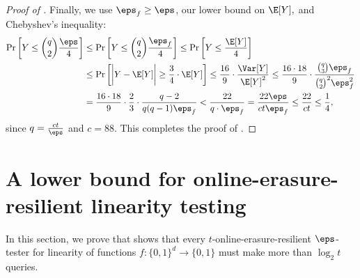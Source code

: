 \documentclass[11pt]{article}
\numberwithin{equation}{section}
\theoremstyle{definition}
\theoremstyle{plain}
\begin{document}
\begin{proof}[Proof of ]
Finally, we use $\eps_f \geq \eps$, our lower bound on $\E[Y],$ and Chebyshev's inequality:
\begin{align*}  %
%
\Pr \bigg[Y \leq \binom{q}{2} \frac{\eps}{4} \bigg] &\leq \Pr \bigg[Y \leq \binom{q}{2}\frac{\eps_f}{4} \bigg] \leq  
                                                      \Pr\bigg[Y \leq \frac{\E[Y]}{4}\bigg]\\
                                                    & \leq \Pr\bigg[\bigg|Y -\E[Y]\bigg| \geq \frac 3 4 \cdot{\E[Y]}\bigg]
                                                    \leq \frac{16}9\cdot \frac{\Var[Y]}{\E[Y]^2} 
    \leq \frac {16\cdot 18} 9 \cdot \frac{\binom{q}{3}\eps_f}{\binom{q}{2}^2\eps_f^2} \\
    &= \frac {16\cdot 18} 9\cdot \frac 2 3 \cdot \frac{q-2}{q(q-1) \eps_f} 
  < \frac{22}{q\cdot \eps_f} = \frac{22\eps}{ct\eps_f} \leq \frac{22}{ct} \leq \frac{1}{4},
\end{align*}
since $q= \frac{ct}{\eps}$ and  $c=88$. This completes the proof of .
\end{proof}

%
\section{A lower bound for online-erasure-resilient linearity testing}\label{sec:linearity_lower}

In this section, we prove  that 
shows that every $t$-online-erasure-resilient $\eps$-tester for linearity of functions $f \colon \{0,1\}^d\to \{0,1\}$ must make more than $\log_2 t$ queries.
\end{document}
